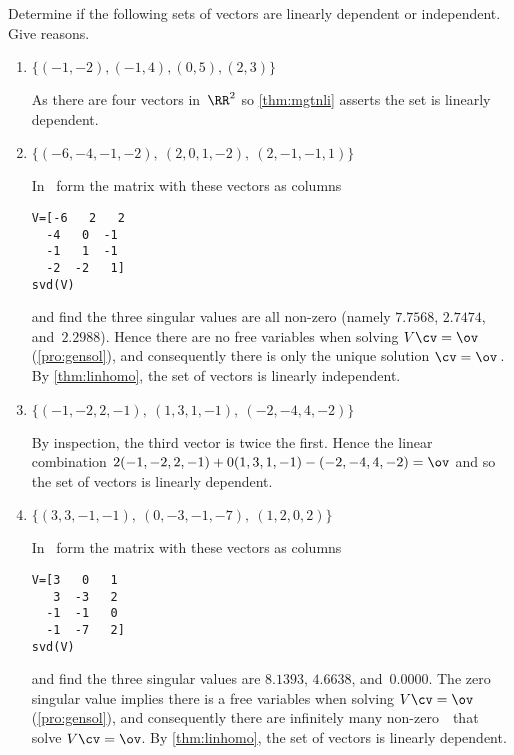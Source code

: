 \begin{example} \label{eg:}
Determine if the following sets of vectors are linearly dependent or independent.  Give reasons.

\begin{enumerate}
\item \(\{(-1,-2), (-1,4), (0,5), (2,3)\}\)
\begin{solution} 
As there are four vectors in~\(\RR^2\) so \autoref{thm:mgtnli} asserts the set is linearly dependent.
\end{solution}

\item \(\{(-6,-4,-1,-2),\ (2,0,1,-2),\ (2,-1,-1,1)\}\)
\begin{solution} 
In \script\ form the matrix with these vectors as columns
\begin{verbatim}
V=[-6   2   2
  -4   0  -1
  -1   1  -1
  -2  -2   1]
svd(V)
\end{verbatim}
\setbox\ajrqrbox\hbox{}%
\marginpar{\usebox{\ajrqrbox}}%
and find the three singular values are all non-zero (namely \(7.7568\), \(2.7474\), and~\(2.2988\)).
Hence there are no free variables when solving \(V\cv=\ov\) (\autoref{pro:gensol}), and consequently there is only the unique solution \(\cv=\ov\)\,.
By \autoref{thm:linhomo}, the set of vectors is linearly independent.
\end{solution}

\item \(\{(-1,-2,2,-1),\ (1,3,1,-1),\ (-2,-4,4,-2)\}\)
\begin{solution} 
By inspection, the third vector is twice the first.
Hence the linear combination \(2(-1,-2,2,-1)+0(1,3,1,-1)-(-2,-4,4,-2)=\ov\) and so the set of vectors is linearly dependent. 
\end{solution}

\item \(\{(3,3,-1,-1),\ (0,-3,-1,-7),\ (1,2,0,2)\}\)
\begin{solution} 
In \script\ form the matrix with these vectors as columns
\begin{verbatim}
V=[3   0   1
   3  -3   2
  -1  -1   0
  -1  -7   2]
svd(V)
\end{verbatim}
\setbox\ajrqrbox\hbox{}%
\marginpar{\usebox{\ajrqrbox}}%
and find the three singular values are \(8.1393\), \(4.6638\), and~\(0.0000\).
The zero singular value implies there is a free variables when solving \(V\cv=\ov\) (\autoref{pro:gensol}), and consequently there are infinitely many non-zero~\cv\ that solve \(V\cv=\ov\).
By \autoref{thm:linhomo}, the set of vectors is linearly dependent.
\end{solution}


\end{enumerate}
\end{example}
